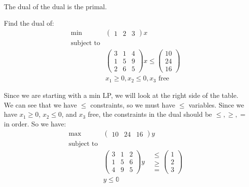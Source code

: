 \documentclass[a4paper]{report}
\newcommand\m[1]{\begin{pmatrix}#1\end{pmatrix}}
\begin{document}
\begin{remark}
  The dual of the dual is the primal.
\end{remark}

\begin{eg}\label{eg}
Find the dual of: \\
\begin{equation*}
  \begin{aligned}
    \min & \m{1 & 2 & 3}x \\
    \text{subject to} & \\
                      & \m{3 & 1 & 4
                          \\ 1 & 5 & 9
                          \\ 2 & 6 & 5}x \leq \m{10 \\ 24 \\ 16} \\
                      & x_1 \geq 0, x_2 \leq 0, x_3 \text{ free}
  \end{aligned}
\end{equation*}
\begin{answer}
  Since we are starting with a min LP, we will look at the right side of the table. We can see that we have $\leq$ constraints, so we must have $\leq$ variables. Since we have $x_1 \geq 0$, $x_2 \leq 0$, and $x_3$ free, the constraints in the dual should be $\leq, \geq, =$ in  order. So we have:
  \begin{equation*}
  \begin{aligned}
    \max & \m{10 & 24 & 16}y \\
    \text{subject to} & \\
                      & \m{3 & 1 & 2
                          \\ 1 & 5 & 6
                        \\ 4 & 9 & 5}y 
                        \quad 
                        \begin{matrix} \leq \\ \geq \\ = \end{matrix} 
                        \m{1 \\ 2 \\ 3} \\
                      & y \leq \mathbb 0
  \end{aligned}
\end{equation*}
                        \end{answer}
\end{eg}
\end{document}
